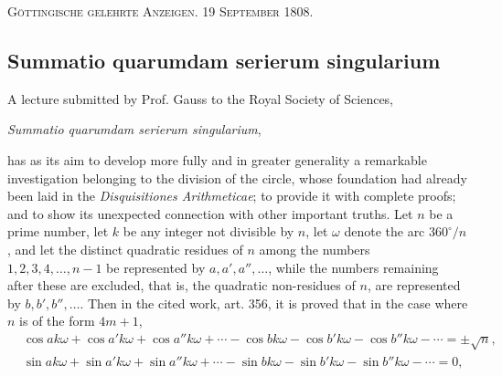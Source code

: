 \documentclass[12pt]{article}
\begin{document}
\begin{center}
\textsc{Göttingische gelehrte Anzeigen. 19 September 1808.}
\end{center}

\subsection*{Summatio quarumdam serierum singularium}

A lecture submitted by Prof. Gauss to the Royal Society of Sciences,
\begin{center}\textit{Summatio quarumdam serierum singularium},\end{center}
has as its aim to develop more fully and in greater generality a remarkable investigation belonging to the division of the circle, whose foundation had already been laid in the \textit{Disquisitiones Arithmeticae}; to provide it with complete proofs; and to show its unexpected connection with other important truths. Let $n$ be a prime number, let $k$ be any integer not divisible by $n$, let $\omega$ denote the arc $360^\circ/n$, and let the distinct quadratic residues of $n$ among the numbers $1,2,3,4,\ldots,n-1$ be represented by $a,a',a'',\ldots$, while the numbers remaining after these are excluded, that is, the quadratic non-residues of $n$, are represented by $b,b',b'',\ldots$. Then in the cited work, art. 356, it is proved that in the case where $n$ is of the form $4m+1$,
\begin{align*}
&\cos ak\omega+\cos a'k\omega+\cos a''k\omega+\cdots
 -\cos bk\omega-\cos b'k\omega-\cos b''k\omega-\cdots = \pm\sqrt n,\\
&\sin ak\omega+\sin a'k\omega+\sin a''k\omega+\cdots
 -\sin bk\omega-\sin b'k\omega-\sin b''k\omega-\cdots =0,
\end{align*}
\end{document}
